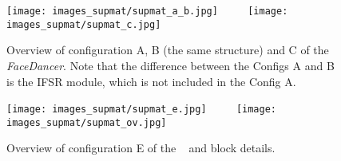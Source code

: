 \documentclass[10pt,twocolumn,letterpaper]{article}
\newcommand{\fti}[1]{\textit{FaceDancer}{#1}}
\begin{document}
\begin{figure*}[htp]
\centering
\texttt{[image: images\_supmat/supmat\_a\_b.jpg]} ~~~~
\texttt{[image: images\_supmat/supmat\_c.jpg]}
\caption{Overview of configuration A, B (the same structure) and C of the \fti. Note that the difference between the Configs A and B is the IFSR module, which is not included in the Config A. }
\label{fig:configabc}
\end{figure*}

\begin{figure*}[htp]
\centering
\texttt{[image: images\_supmat/supmat\_e.jpg]} ~~~~
\texttt{[image: images\_supmat/supmat\_ov.jpg]}
\caption{Overview of configuration E of the \fti~ and block details.}
\label{fig:confige}
\end{figure*}
\end{document}
